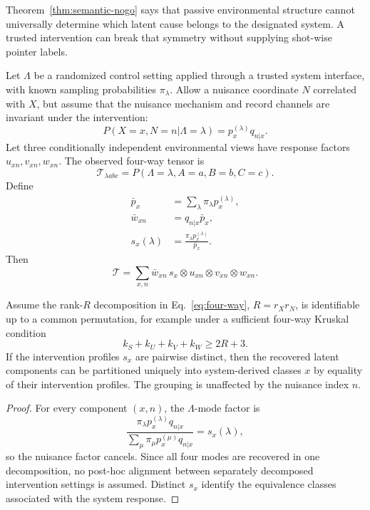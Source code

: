 Theorem~\ref{thm:semantic-nogo} says that passive environmental structure cannot universally determine which latent cause belongs to the designated system.  A trusted intervention can break that symmetry without supplying shot-wise pointer labels.

Let $\Lambda$ be a randomized control setting applied through a trusted system interface, with known sampling probabilities $\pi_\lambda$.  Allow a nuisance coordinate $N$ correlated with $X$, but assume that the nuisance mechanism and record channels are invariant under the intervention:
\begin{equation}
P(X=x,N=n|\Lambda=\lambda)=p_x^{(\lambda)}q_{n|x}.
\label{eq:intervention-factor}
\end{equation}
Let three conditionally independent environmental views have response factors $u_{xn},v_{xn},w_{xn}$.  The observed four-way tensor is
\begin{equation}
\mathcal T_{\lambda abc}
=P(\Lambda=\lambda,A=a,B=b,C=c).
\end{equation}
Define
\begin{align}
\bar p_x&=\sum_\lambda\pi_\lambda p_x^{(\lambda)},\\
\bar w_{xn}&=q_{n|x}\bar p_x,\\
s_x(\lambda)&=\frac{\pi_\lambda p_x^{(\lambda)}}{\bar p_x}.
\end{align}
Then
\begin{equation}
\mathcal T=\sum_{x,n}\bar w_{xn}\,
 s_x\otimes u_{xn}\otimes v_{xn}\otimes w_{xn}.
\label{eq:four-way}
\end{equation}

\begin{theorem}
\label{thm:intervention}
Assume the rank-$R$ decomposition in Eq.~\eqref{eq:four-way}, $R=r_Xr_N$, is identifiable up to a common permutation, for example under a sufficient four-way Kruskal condition
\begin{equation}
k_S+k_U+k_V+k_W\ge2R+3.
\end{equation}
If the intervention profiles $s_x$ are pairwise distinct, then the recovered latent components can be partitioned uniquely into system-derived classes $x$ by equality of their intervention profiles.  The grouping is unaffected by the nuisance index $n$.
\end{theorem}

\begin{proof}
For every component $(x,n)$, the $\Lambda$-mode factor is
\begin{equation}
\frac{\pi_\lambda p_x^{(\lambda)}q_{n|x}}
{\sum_\mu\pi_\mu p_x^{(\mu)}q_{n|x}}
=s_x(\lambda),
\end{equation}
so the nuisance factor cancels.  Since all four modes are recovered in one decomposition, no post-hoc alignment between separately decomposed intervention settings is assumed.  Distinct $s_x$ identify the equivalence classes associated with the system response.\qedhere
\end{proof}

